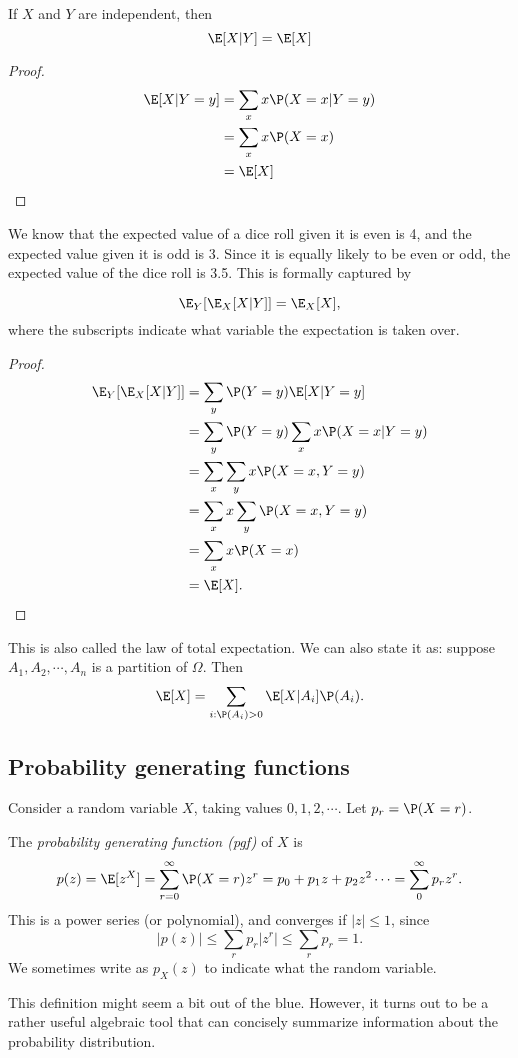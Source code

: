 \documentclass[a4paper]{article}
\begin{document}
\begin{thm}
  If $X$ and $Y$ are independent, then
  \[
    \E[X|Y] = \E[X]
  \]
\end{thm}

\begin{proof}
  \begin{align*}
    \E[X|Y = y] &= \sum_{x}x\P(X = x|Y = y)\\
    &= \sum_x x\P(X = x)\\
    &= \E[X]
  \end{align*}
\end{proof}

We know that the expected value of a dice roll given it is even is 4, and the expected value given it is odd is 3. Since it is equally likely to be even or odd, the expected value of the dice roll is 3.5. This is formally captured by
\begin{thm}
  \[
    \E_Y[\E_X[X|Y]] = \E_X[X],
  \]
  where the subscripts indicate what variable the expectation is taken over.
\end{thm}

\begin{proof}
  \begin{align*}
    \E_Y[\E_X[X|Y]] &= \sum_y \P(Y = y)\E[X|Y = y]\\
    &= \sum _y \P(Y = y) \sum_{x}x\P(X = x|Y = y)\\
    &= \sum_x\sum_y x\P(X = x, Y = y)\\
    &= \sum _x x\sum_y \P(X = x, Y = y)\\
    &= \sum_x x\P(X = x)\\
    &= \E[X].
  \end{align*}
\end{proof}
This is also called the law of total expectation. We can also state it as: suppose $A_1, A_2, \cdots, A_n$ is a partition of $\Omega$. Then
\[
  \E[X] = \sum_{i: \P(A_i) > 0}\E[X|A_i]\P(A_i).
\]

\subsection{Probability generating functions}
Consider a random variable $X$, taking values $0, 1, 2, \cdots$. Let $p_r = \P(X = r)$.
\begin{defi}
  The \emph{probability generating function (pgf)} of $X$ is
  \[
    p(z) = \E[z^X] = \sum_{r = 0}^\infty \P(X = r)z^r = p_0 + p_1z + p_2z^2\cdots = \sum_0^\infty p_rz^r.
  \]
  This is a power series (or polynomial), and converges if $|z| \leq 1$, since
  \[
    |p(z)| \leq \sum_r p_r |z^r| \leq \sum_r p_r = 1.
  \]
  We sometimes write as $p_X(z)$ to indicate what the random variable.
\end{defi}
This definition might seem a bit out of the blue. However, it turns out to be a rather useful algebraic tool that can concisely summarize information about the probability distribution.
\end{document}
